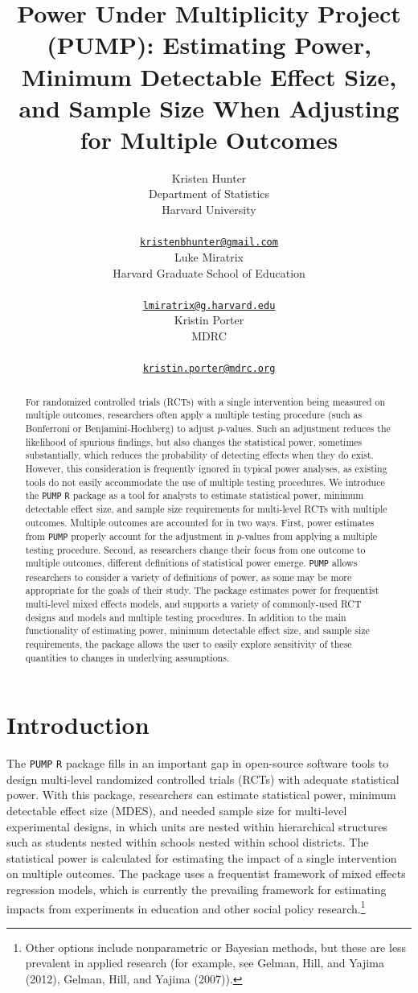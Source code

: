 \documentclass{article}
\title{Power Under Multiplicity Project (PUMP): Estimating Power,
Minimum Detectable Effect Size, and Sample Size When Adjusting for
Multiple Outcomes}
\author{
    Kristen Hunter
   \\
    Department of Statistics \\
    Harvard University \\
   \\
  \texttt{\href{mailto:kristenbhunter@gmail.com}{\nolinkurl{kristenbhunter@gmail.com}}} \\
   \And
    Luke Miratrix
   \\
    Harvard Graduate School of Education \\
   \\
  \texttt{\href{mailto:lmiratrix@g.harvard.edu}{\nolinkurl{lmiratrix@g.harvard.edu}}} \\
   \And
    Kristin Porter
   \\
    MDRC \\
   \\
  \texttt{\href{mailto:kristin.porter@mdrc.org}{\nolinkurl{kristin.porter@mdrc.org}}} \\
  }
\begin{document}
\maketitle


\begin{abstract}
For randomized controlled trials (RCTs) with a single intervention being
measured on multiple outcomes, researchers often apply a multiple
testing procedure (such as Bonferroni or Benjamini-Hochberg) to adjust
\(p\)-values. Such an adjustment reduces the likelihood of spurious
findings, but also changes the statistical power, sometimes
substantially, which reduces the probability of detecting effects when
they do exist. However, this consideration is frequently ignored in
typical power analyses, as existing tools do not easily accommodate the
use of multiple testing procedures. We introduce the \texttt{PUMP}
\texttt{R} package as a tool for analysts to estimate statistical power,
minimum detectable effect size, and sample size requirements for
multi-level RCTs with multiple outcomes. Multiple outcomes are accounted
for in two ways. First, power estimates from \texttt{PUMP} properly
account for the adjustment in \(p\)-values from applying a multiple
testing procedure. Second, as researchers change their focus from one
outcome to multiple outcomes, different definitions of statistical power
emerge. \texttt{PUMP} allows researchers to consider a variety of
definitions of power, as some may be more appropriate for the goals of
their study. The package estimates power for frequentist multi-level
mixed effects models, and supports a variety of commonly-used RCT
designs and models and multiple testing procedures. In addition to the
main functionality of estimating power, minimum detectable effect size,
and sample size requirements, the package allows the user to easily
explore sensitivity of these quantities to changes in underlying
assumptions.
\end{abstract}


\section{Introduction}
\label{sec:intro}

The \texttt{PUMP} \texttt{R} package fills in an important gap in
open-source software tools to design multi-level randomized controlled
trials (RCTs) with adequate statistical power. With this package,
researchers can estimate statistical power, minimum detectable effect
size (MDES), and needed sample size for multi-level experimental
designs, in which units are nested within hierarchical structures such
as students nested within schools nested within school districts. The
statistical power is calculated for estimating the impact of a single
intervention on multiple outcomes. The package uses a frequentist
framework of mixed effects regression models, which is currently the
prevailing framework for estimating impacts from experiments in
education and other social policy research.\footnote{Other options
  include nonparametric or Bayesian methods, but these are less
  prevalent in applied research (for example, see Gelman, Hill, and
  Yajima (2012), Gelman, Hill, and Yajima (2007)).}
\end{document}
